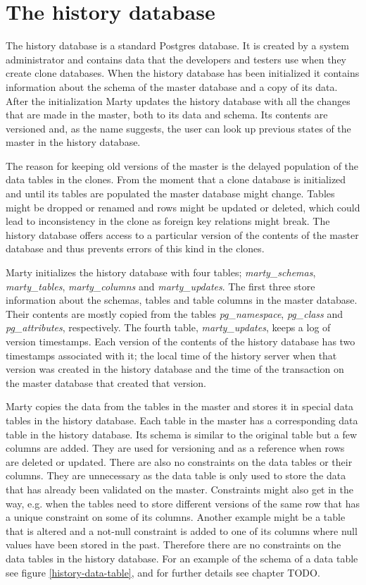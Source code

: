 \section{The history database}
The history database is a standard Postgres database.
It is created by a system administrator and contains data that the developers and testers use when they create clone databases.
When the history database has been initialized it contains information about the schema of the master database and a copy of its data.
After the initialization Marty updates the history database with all the changes that are made in the master, both to its data and schema.
Its contents are versioned and, as the name suggests, the user can look up previous states of the master in the history database.

The reason for keeping old versions of the master is the delayed population of the data tables in the clones.
From the moment that a clone database is initialized and until its tables are populated the master database might change.
Tables might be dropped or renamed and rows might be updated or deleted, which could lead to inconsistency in the clone as foreign key relations might break.
The history database offers access to a particular version of the contents of the master database and thus prevents errors of this kind in the clones.

Marty initializes the history database with four tables; \textit{marty\_schemas}, \textit{marty\_tables}, \textit{marty\_columns} and \textit{marty\_updates}.
The first three store information about the schemas, tables and table columns in the master database.
Their contents are mostly copied from the tables \textit{pg\_namespace}, \textit{pg\_class} and \textit{pg\_attributes}, respectively.
The fourth table, \textit{marty\_updates}, keeps a log of version timestamps.
Each version of the contents of the history database has two timestamps associated with it; the local time of the history server when that version was created in the history database and the time of the transaction on the master database that created that version.

Marty copies the data from the tables in the master and stores it in special data tables in the history database.
Each table in the master has a corresponding data table in the history database.
Its schema is similar to the original table but a few columns are added.
They are used for versioning and as a reference when rows are deleted or updated.
There are also no constraints on the data tables or their columns.
They are unnecessary as the data table is only used to store the data that has already been validated on the master.
Constraints might also get in the way, e.g. when the tables need to store different versions of the same row that has a unique constraint on some of its columns.
Another example might be a table that is altered and a not-null constraint is added to one of its columns where null values have been stored in the past.
Therefore there are no constraints on the data tables in the history database.
For an example of the schema of a data table see figure \ref{history-data-table}, and for further details see chapter TODO.

